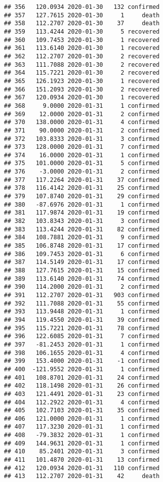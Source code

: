 \documentclass[
]{article}
\begin{document}
\begin{verbatim}
## 356   120.0934 2020-01-30   132 confirmed
## 357   127.7615 2020-01-30     1     death
## 358   112.2707 2020-01-30    37     death
## 359   113.4244 2020-01-30     5 recovered
## 360   109.7453 2020-01-30     1 recovered
## 361   113.6140 2020-01-30     1 recovered
## 362   112.2707 2020-01-30     2 recovered
## 363   111.7088 2020-01-30     2 recovered
## 364   115.7221 2020-01-30     2 recovered
## 365   126.1923 2020-01-30     1 recovered
## 366   151.2093 2020-01-30     2 recovered
## 367   120.0934 2020-01-30     1 recovered
## 368     9.0000 2020-01-31     1 confirmed
## 369    12.0000 2020-01-31     2 confirmed
## 370   138.0000 2020-01-31     4 confirmed
## 371    90.0000 2020-01-31     2 confirmed
## 372   103.8333 2020-01-31     3 confirmed
## 373   128.0000 2020-01-31     7 confirmed
## 374    16.0000 2020-01-31     1 confirmed
## 375   101.0000 2020-01-31     5 confirmed
## 376    -3.0000 2020-01-31     2 confirmed
## 377   117.2264 2020-01-31    37 confirmed
## 378   116.4142 2020-01-31    25 confirmed
## 379   107.8740 2020-01-31    29 confirmed
## 380   -87.6976 2020-01-31     1 confirmed
## 381   117.9874 2020-01-31    19 confirmed
## 382   103.8343 2020-01-31     3 confirmed
## 383   113.4244 2020-01-31    82 confirmed
## 384   108.7881 2020-01-31     9 confirmed
## 385   106.8748 2020-01-31    17 confirmed
## 386   109.7453 2020-01-31     6 confirmed
## 387   114.5149 2020-01-31    17 confirmed
## 388   127.7615 2020-01-31    15 confirmed
## 389   113.6140 2020-01-31    74 confirmed
## 390   114.2000 2020-01-31     2 confirmed
## 391   112.2707 2020-01-31   903 confirmed
## 392   111.7088 2020-01-31    55 confirmed
## 393   113.9448 2020-01-31     1 confirmed
## 394   119.4550 2020-01-31    39 confirmed
## 395   115.7221 2020-01-31    78 confirmed
## 396   122.6085 2020-01-31     7 confirmed
## 397   -81.2453 2020-01-31     1 confirmed
## 398   106.1655 2020-01-31     4 confirmed
## 399   153.4000 2020-01-31    -1 confirmed
## 400  -121.9552 2020-01-31     1 confirmed
## 401   108.8701 2020-01-31    24 confirmed
## 402   118.1498 2020-01-31    26 confirmed
## 403   121.4491 2020-01-31    23 confirmed
## 404   112.2922 2020-01-31     4 confirmed
## 405   102.7103 2020-01-31    35 confirmed
## 406   121.0000 2020-01-31     1 confirmed
## 407   117.3230 2020-01-31     1 confirmed
## 408   -79.3832 2020-01-31     1 confirmed
## 409   144.9631 2020-01-31     1 confirmed
## 410    85.2401 2020-01-31     3 confirmed
## 411   101.4870 2020-01-31    13 confirmed
## 412   120.0934 2020-01-31   110 confirmed
## 413   112.2707 2020-01-31    42     death

\end{verbatim}
\end{document}
